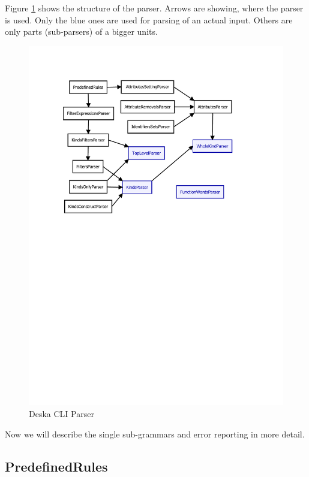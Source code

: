 \documentclass[deska]{subfiles}
\begin{document}
Figure \ref{img:deska-cli-parser} shows the structure of the parser. Arrows are showing, where the parser is used. Only the blue
ones are used for parsing of an actual input. Others are only parts (sub-parsers) of a bigger units.

\begin{figure}[h]
    \centering
    \label{img:deska-cli-parser}
    \includegraphics[trim=28mm 157mm 41mm 28mm, clip=true]{img-deska-cli-parser.pdf}
    \caption{Deska CLI Parser}
\end{figure}

Now we will describe the single sub-grammars and error reporting in more detail.

\subsection{PredefinedRules}
\end{document}
